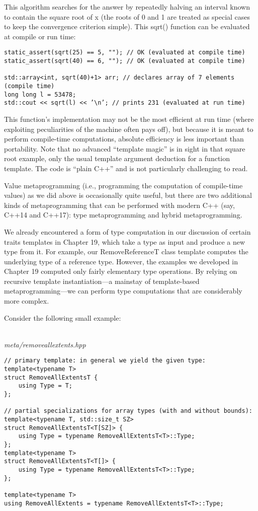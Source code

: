 This algorithm searches for the answer by repeatedly halving an interval known to contain the square root of x (the roots of 0 and 1 are treated as special cases to keep the convergence criterion simple). This sqrt() function can be evaluated at compile or run time:

\begin{lstlisting}[style=styleCXX]
static_assert(sqrt(25) == 5, ""); // OK (evaluated at compile time)
static_assert(sqrt(40) == 6, ""); // OK (evaluated at compile time)

std::array<int, sqrt(40)+1> arr; // declares array of 7 elements (compile time)
long long l = 53478;
std::cout << sqrt(l) << ’\n’; // prints 231 (evaluated at run time)
\end{lstlisting}

This function’s implementation may not be the most efficient at run time (where exploiting peculiarities of the machine often pays off), but because it is meant to perform compile-time computations, absolute efficiency is less important than portability. Note that no advanced “template magic” is in sight in that square root example, only the usual template argument deduction for a function template. The code is “plain C++” and is not particularly challenging to read.

Value metaprogramming (i.e., programming the computation of compile-time values) as we did above is occasionally quite useful, but there are two additional kinds of metaprogramming that can be performed with modern C++ (say, C++14 and C++17): type metaprogramming and hybrid metaprogramming.


We already encountered a form of type computation in our discussion of certain traits templates in Chapter 19, which take a type as input and produce a new type from it. For example, our RemoveReferenceT class template computes the underlying type of a reference type. However, the examples we developed in Chapter 19 computed only fairly elementary type operations. By relying on recursive template instantiation—a mainstay of template-based metaprogramming—we can perform type computations that are considerably more complex.

Consider the following small example:

\hspace*{\fill} \\ %
\noindent
\textit{meta/removeallextents.hpp}
\begin{lstlisting}[style=styleCXX]
// primary template: in general we yield the given type:
template<typename T>
struct RemoveAllExtentsT {
	using Type = T;
};

// partial specializations for array types (with and without bounds):
template<typename T, std::size_t SZ>
struct RemoveAllExtentsT<T[SZ]> {
	using Type = typename RemoveAllExtentsT<T>::Type;
};
template<typename T>
struct RemoveAllExtentsT<T[]> {
	using Type = typename RemoveAllExtentsT<T>::Type;
};

template<typename T>
using RemoveAllExtents = typename RemoveAllExtentsT<T>::Type;
\end{lstlisting}

